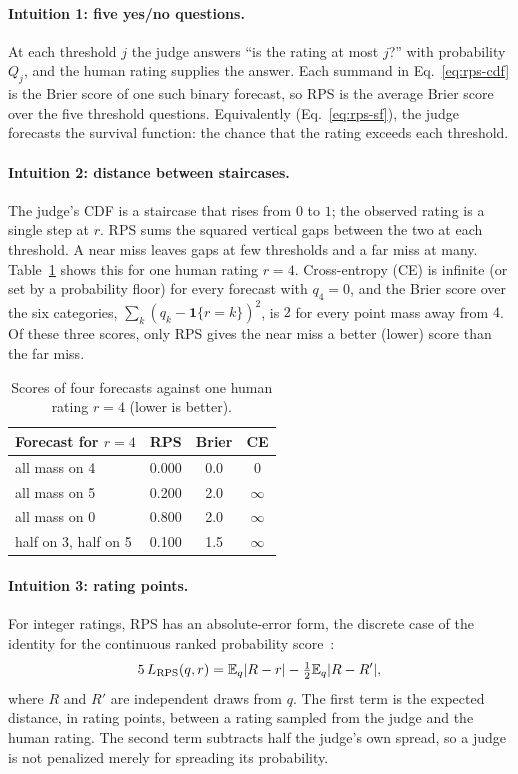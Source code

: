 \paragraph{Intuition 1: five yes/no questions.}
At each threshold $j$ the judge answers ``is the rating at most $j$?'' with probability $Q_j$, and the human rating supplies the answer.
Each summand in Eq.~\ref{eq:rps-cdf} is the Brier score of one such binary forecast, so RPS is the average Brier score over the five threshold questions.
Equivalently (Eq.~\ref{eq:rps-sf}), the judge forecasts the survival function: the chance that the rating exceeds each threshold.

\paragraph{Intuition 2: distance between staircases.}
The judge's CDF is a staircase that rises from $0$ to $1$; the observed rating is a single step at $r$.
RPS sums the squared vertical gaps between the two at each threshold.
A near miss leaves gaps at few thresholds and a far miss at many.
Table~\ref{tab:rps-examples} shows this for one human rating $r=4$.
Cross-entropy (CE) is infinite (or set by a probability floor) for every forecast with $q_4=0$, and the Brier score over the six categories, $\sum_k(q_k-\mathbf{1}\{r=k\})^2$, is $2$ for every point mass away from $4$.
Of these three scores, only RPS gives the near miss a better (lower) score than the far miss.

\begin{table}[h]
\centering\small
\begin{tabular}{lccc}
\toprule
Forecast for $r=4$ & RPS & Brier & CE \\
\midrule
all mass on 4 & 0.000 & 0.0 & 0 \\
all mass on 5 & 0.200 & 2.0 & $\infty$ \\
all mass on 0 & 0.800 & 2.0 & $\infty$ \\
half on 3, half on 5 & 0.100 & 1.5 & $\infty$ \\
\bottomrule
\end{tabular}
\caption{Scores of four forecasts against one human rating $r=4$ (lower is better).}
\label{tab:rps-examples}
\end{table}

\paragraph{Intuition 3: rating points.}
For integer ratings, RPS has an absolute-error form, the discrete case of the identity for the continuous ranked probability score~\citep{matheson1976scoring,gneiting2007strictly}:
\begin{equation}
5\,L_{\rm RPS}(q,r)=\mathbb{E}_q\lvert R-r\rvert-\tfrac{1}{2}\mathbb{E}_q\lvert R-R'\rvert,
\end{equation}
where $R$ and $R'$ are independent draws from $q$.
The first term is the expected distance, in rating points, between a rating sampled from the judge and the human rating.
The second term subtracts half the judge's own spread, so a judge is not penalized merely for spreading its probability.

